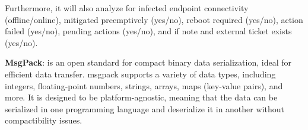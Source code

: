 \begin{multicols}{2}

Furthermore, it will also analyze for infected endpoint connectivity (offline/online), mitigated preemptively (yes/no),
reboot required (yes/no), action failed (yes/no), pending actions (yes/no), and if note and external ticket exists (yes/no).

\begin{multicols}{2}
      \textbf{MsgPack}: is an open standard for compact binary data serialization, ideal for efficient data transfer.
      \acrshort{msgpack} supports a variety of data types, including integers, floating-point numbers, strings,
      arrays, maps (key-value pairs), and more. It is designed to be platform-agnostic, meaning that the data can be
      serialized in one programming language and deserialize it in another without compactibility issues.
\end{multicols}


\end{multicols}
